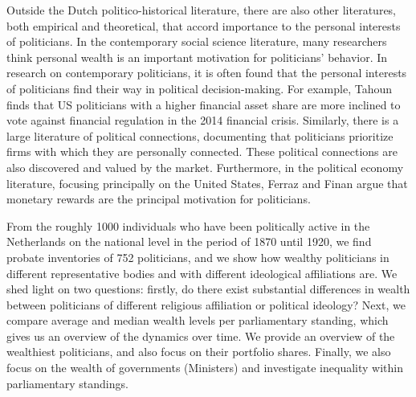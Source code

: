     Outside the Dutch politico-historical literature, there are also other literatures, both empirical and theoretical, that accord importance to the personal interests of politicians. In the contemporary social science literature, many researchers think personal wealth is an important motivation for politicians' behavior. %
    In research on contemporary politicians, it is often found that the personal interests of politicians find their way in political decision-making. For example, Tahoun finds that US politicians with a higher financial asset share are more inclined to vote against financial regulation in the 2014 financial crisis.\autocite{tahoun2019personal} Similarly, there is a large literature of political connections, documenting that politicians prioritize firms with which they are personally connected\autocite[see e.g.][]{duchin2012politics}. These political connections are also discovered and valued by the market.\autocite{fisman2001estimating} Furthermore, in the political economy literature, focusing principally on the United States, Ferraz and Finan argue that monetary rewards are the principal motivation for politicians.\autocite{ferraz2009motivating}
    
    From the roughly 1000 individuals who have been politically active in the Netherlands on the national level in the period of 1870 until 1920, we find probate inventories of 752 politicians, and we show how wealthy politicians in different representative bodies and with different ideological affiliations are. We shed light on two questions: firstly, do there exist substantial differences in wealth between politicians of different religious affiliation or political ideology? Next, we compare average and median wealth levels per parliamentary standing, which gives us an overview of the dynamics over time. We provide an overview of the wealthiest politicians, and also focus on their portfolio shares. Finally, we also focus on the wealth of governments (Ministers) and investigate inequality within parliamentary standings. 

